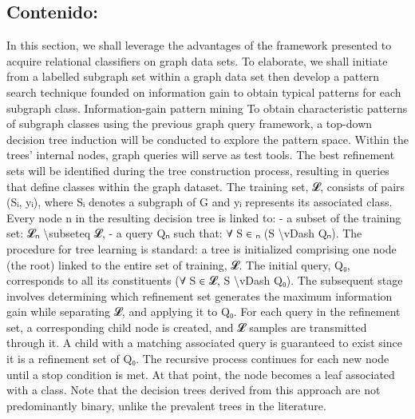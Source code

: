 \documentclass{article}%
\begin{document}
\subsection{Contenido:}%
\label{subsec:Contenido}%
In this section, we shall leverage the advantages of the framework presented to acquire relational classifiers on graph data sets. To elaborate, we shall initiate from a labelled subgraph set within a graph data set then develop a pattern search technique founded on information gain to obtain typical patterns for each subgraph class.\newline%
\newline%
Information{-}gain pattern mining\newline%
\newline%
To obtain characteristic patterns of subgraph classes using the previous graph query framework, a top{-}down decision tree induction will be conducted to explore the pattern space. Within the trees' internal nodes, graph queries will serve as test tools. The best refinement sets will be identified during the tree construction process, resulting in queries that define classes within the graph dataset.\newline%
\newline%
The training set, 𝓛, consists of pairs (Sᵢ, yᵢ), where Sᵢ denotes a subgraph of G and yᵢ represents its associated class. Every node n in the resulting decision tree is linked to:\newline%
\newline%
{-} a subset of the training set: 𝓛ₙ \textbackslash{}subseteq 𝓛,\newline%
{-} a query Qₙ such that: ∀ S ∈ ₙ (S \textbackslash{}vDash Qₙ).\newline%
\newline%
The procedure for tree learning is standard: a tree is initialized comprising one node (the root) linked to the entire set of training, 𝓛. The initial query, Q₀, corresponds to all its constituents (∀ S ∈ 𝓛, S \textbackslash{}vDash Q₀). The subsequent stage involves determining which refinement set generates the maximum information gain while separating 𝓛, and applying it to Q₀. For each query in the refinement set, a corresponding child node is created, and 𝓛 samples are transmitted through it. A child with a matching associated query is guaranteed to exist since it is a refinement set of Q₀. The recursive process continues for each new node until a stop condition is met. At that point, the node becomes a leaf associated with a class. Note that the decision trees derived from this approach are not predominantly binary, unlike the prevalent trees in the literature.\newline%
\end{document}
